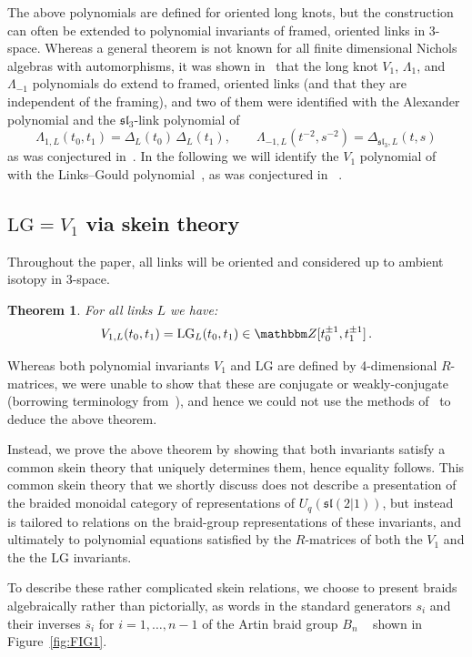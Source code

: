 \documentclass[12pt,reqno]{amsart}
\newtheorem{theorem}{Theorem}[section]
\theoremstyle{definition}
\def\BZ{\mathbbm Z}
\def\be{\begin{equation}}
\def\ee{\end{equation}}
\newcommand{\slthree}{\mathfrak{sl}_3}
\def\hs{\overline{s}}
\def\LG{\mathrm{LG}}
\begin{document}
The above polynomials are defined for oriented long knots, but the
construction can often be extended to polynomial invariants of framed, oriented
links in 3-space. Whereas a general theorem is not known for all finite dimensional
Nichols algebras with automorphisms, it was shown in~\cite{GHKST} that the
long knot $V_1$, $\Lambda_1$, and $\Lambda_{-1}$ polynomials do extend
to framed, oriented links (and that they are independent of the framing), and two
of them were identified with the Alexander polynomial and the $\slthree$-link polynomial
of~\cite{Harper}
\be
\Lambda_{1,L}(t_0, t_1) = \Delta_L (t_0) \, \Delta_L(t_1), \qquad
\Lambda_{-1,L}(t^{-2}, s^{-2}) = \Delta_{\slthree,L}(t,s) 
\ee
as was conjectured in~\cite{GK:multi}. In the following we will identify the $V_1$ polynomial
of~\cite{GK:multi} with the Links--Gould polynomial~\cite{LG}, as was conjectured in
~\cite{GK:multi}.


\subsection{\texorpdfstring{$\LG = V_1$}{LG=V1} via skein theory}

Throughout the paper, all links will be oriented and considered
up to ambient isotopy in 3-space. 

\begin{theorem}
\label{thm.1}
For all links $L$ we have:
\be
V_{1,L}(t_0,t_1) = \LG_L(t_0,t_1) \in \BZ[t_0^{\pm 1},t_1^{\pm 1}] \,.
\ee
\end{theorem}

Whereas both polynomial invariants $V_1$ and $\LG$ are defined by 4-dimensional
$R$-matrices, we were unable to show that these are conjugate or weakly-conjugate
(borrowing terminology from~\cite{GHKST}), and hence we could not use the methods
of~\cite{GHKST} to deduce the above theorem.

Instead, we prove the above theorem by
showing that both invariants satisfy a common skein theory that uniquely determines
them, hence equality follows. This common skein theory that we shortly discuss does
not describe a presentation of the braided monoidal category of representations of
$U_q(\mathfrak{sl}(2|1))$, but instead is tailored to relations on the braid-group
representations of these invariants, and ultimately to polynomial equations satisfied
by the $R$-matrices of both the $V_1$ and the the $\LG$ invariants.

To describe these rather complicated skein relations, we choose to present braids
algebraically rather than pictorially, as words in the standard generators $s_i$
and their inverses $\hs_i$ for $i=1,\dots,n-1$ of the Artin braid group $B_n$
~\cite{Artin} shown in Figure~\ref{fig:FIG1}. 
\end{document}
